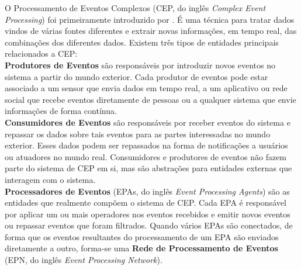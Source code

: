 O Processamento de Eventos Complexos (CEP, do inglês \textit{Complex Event Processing}) foi primeiramente introduzido por \cite{Luckham:2001:PEI:515781}. É uma técnica para tratar dados vindos de várias fontes diferentes e extrair novas informações, em tempo real, das combinações dos diferentes dados. 
Existem três tipos de entidades principais relacionados a CEP: \\

\textbf{Produtores de Eventos} são responsáveis por introduzir novos eventos no sistema a partir do mundo exterior. Cada produtor de eventos pode estar associado a um sensor que envia dados em tempo real, a um aplicativo ou rede social que recebe eventos diretamente de pessoas ou a qualquer sistema que envie informações de forma contínua. \\

\textbf{Consumidores de Eventos} são responsáveis por receber eventos do sistema e repassar os dados sobre tais eventos para as partes interessadas no mundo exterior. Esses dados podem ser repassados na forma de notificações a usuários ou atuadores no mundo real. Consumidores e produtores de eventos não fazem parte do sistema de CEP em si, mas são abstrações para entidades externas que interagem com o sistema. \\

\textbf{Processadores de Eventos}  (EPAs, do inglês \textit{Event Processing Agents}) são as entidades que realmente compõem o sistema de CEP. Cada EPA é responsável por aplicar um ou mais operadores nos eventos recebidos e emitir novos eventos ou repassar eventos que foram filtrados. Quando vários EPAs são conectados, de forma que os eventos resultantes do processamento de um EPA são enviados diretamente a outro, forma-se uma \textbf{Rede de Processamento de Eventos} \label{EPN} (EPN, do inglês \textit{Event Processing Network}). \\

